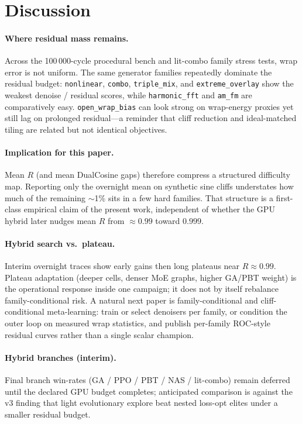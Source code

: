 \section{Discussion}
\label{sec:discussion}

\paragraph{Where residual mass remains.}
Across the 100\,000-cycle procedural bench and lit-combo family stress tests, wrap error is not uniform.
The same generator families repeatedly dominate the residual budget: \texttt{nonlinear}, \texttt{combo}, \texttt{triple\_mix}, and \texttt{extreme\_overlay} show the weakest denoise / residual scores, while \texttt{harmonic\_fft} and \texttt{am\_fm} are comparatively easy.
\texttt{open\_wrap\_bias} can look strong on wrap-energy proxies yet still lag on prolonged residual---a reminder that cliff reduction and ideal-matched tiling are related but not identical objectives.

\paragraph{Implication for this paper.}
Mean $R$ (and mean DualCosine gaps) therefore compress a structured difficulty map.
Reporting only the overnight mean on synthetic sine cliffs understates how much of the remaining $\sim$1\% sits in a few hard families.
That structure is a first-class empirical claim of the present work, independent of whether the GPU hybrid later nudges mean $R$ from $\approx 0.99$ toward $0.999$.

\paragraph{Hybrid search vs.\ plateau.}
Interim overnight traces show early gains then long plateaus near $R\approx 0.99$.
Plateau adaptation (deeper cells, denser MoE graphs, higher GA/PBT weight) is the operational response inside one campaign; it does not by itself rebalance family-conditional risk.
A natural next paper is family-conditional and cliff-conditional meta-learning: train or select denoisers per family, or condition the outer loop on measured wrap statistics, and publish per-family ROC-style residual curves rather than a single scalar champion.

\paragraph{Hybrid branches (interim).}
Final branch win-rates (GA / PPO / PBT / NAS / lit-combo) remain deferred until the declared GPU budget completes; anticipated comparison is against the v3 finding that light evolutionary explore beat nested loss-opt elites under a smaller residual budget.
